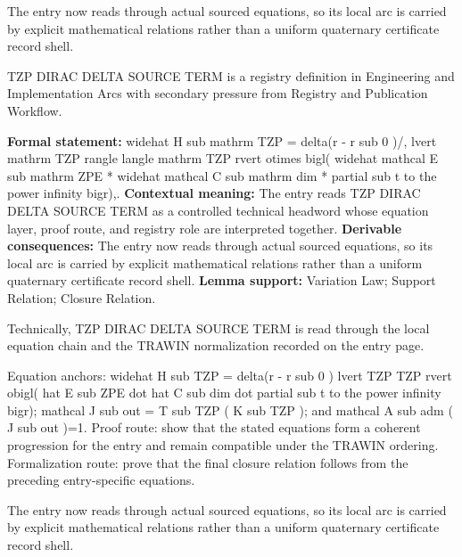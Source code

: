 The entry now reads through actual sourced equations, so its local arc is carried by explicit mathematical relations rather than a uniform quaternary certificate record shell.
\clearpage


\begingroup\small
{}
TZP DIRAC DELTA SOURCE TERM is a registry definition in Engineering and Implementation Arcs with secondary pressure from Registry and Publication Workflow.

\begingroup\footnotesize\setlength{\emergencystretch}{3em}\sloppy
\textbf{Formal statement:} widehat H sub mathrm TZP = delta(r - r sub 0 )/, lvert mathrm TZP rangle langle mathrm TZP rvert otimes bigl( widehat mathcal E sub mathrm ZPE * widehat mathcal C sub mathrm dim * partial sub t to the power infinity bigr),. \textbf{Contextual meaning:} The entry reads TZP DIRAC DELTA SOURCE TERM as a controlled technical headword whose equation layer, proof route, and registry role are interpreted together. \textbf{Derivable consequences:} The entry now reads through actual sourced equations, so its local arc is carried by explicit mathematical relations rather than a uniform quaternary certificate record shell. \textbf{Lemma support:} Variation Law; Support Relation; Closure Relation.\par
\endgroup

Technically, TZP DIRAC DELTA SOURCE TERM is read through the local equation chain and the TRAWIN normalization recorded on the entry page.

Equation anchors: widehat H sub TZP = delta(r - r sub 0 ) lvert TZP TZP rvert obigl( hat E sub ZPE dot hat C sub dim dot partial sub t to the power infinity bigr); mathcal J sub out = T sub TZP ( K sub TZP ); and mathcal A sub adm ( J sub out )=1. Proof route: show that the stated equations form a coherent progression for the entry and remain compatible under the TRAWIN ordering. Formalization route: prove that the final closure relation follows from the preceding entry-specific equations.

The entry now reads through actual sourced equations, so its local arc is carried by explicit mathematical relations rather than a uniform quaternary certificate record shell.
\endgroup

